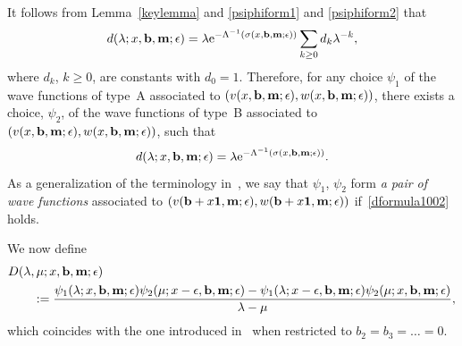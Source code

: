 \documentclass[11pt]{article}
\numberwithin{equation}{section}
\newcommand{\e}{\epsilon}
\newcommand{\nn}{\nonumber}
\newcommand{\beq}{\begin{equation}}
\newcommand{\eeq}{\end{equation}}
\numberwithin{equation}{section}
\begin{document}
It follows from Lemma~\ref{keylemma} and \eqref{psiphiform1} and \eqref{psiphiform2} that
\[
d(\lambda; x, {\bf b}, {\bf m};\e) = \lambda {\rm e}^{-\Lambda^{-1}(\sigma(x, {\bf b},{\bf m};\e))} \sum_{k\ge0} d_k \lambda^{-k},
\]
where $d_k$, $k\ge0$, are constants with $d_0=1$.
Therefore, for any choice $\psi_1$ of
the wave functions of type~A associated to $(v(x, {\bf b}, {\bf m};\e), w(x, {\bf b}, {\bf m};\e))$, there exists a choice, $\psi_2$, of
the wave functions of type~B associated to $(v(x, {\bf b}, {\bf m};\e), w(x, {\bf b}, {\bf m};\e))$, such that
\beq\label{dformula1002}
d(\lambda; x, {\bf b}, {\bf m};\e) = \lambda {\rm e}^{-\Lambda^{-1}(\sigma(x, {\bf b},{\bf m};\e))}.
\eeq
As a generalization of the terminology in~\cite{Y}, we say that $\psi_1$, $\psi_2$ form {\it a pair of wave functions}
associated to $(v({\bf b}+x{\bf 1}, {\bf m};\e), w({\bf b}+x{\bf 1}, {\bf m};\e))$ if~\eqref{dformula1002} holds.

We now define
\begin{align*}%
&D(\lambda,\mu; x, {\bf b}, {\bf m};\e) \\
&\qquad{}:= \frac{\psi_1(\lambda; x, {\bf b}, {\bf m};\e) \psi_2(\mu; x-\e, {\bf b}, {\bf m};\e)
- \psi_1(\lambda; x-\e, {\bf b}, {\bf m};\e) \psi_2(\mu; x, {\bf b}, {\bf m};\e)}{\lambda-\mu}, \nn
\end{align*}
which coincides with the one introduced in~\cite{Y} when restricted to $b_2=b_3=\dots=0$.
\end{document}
